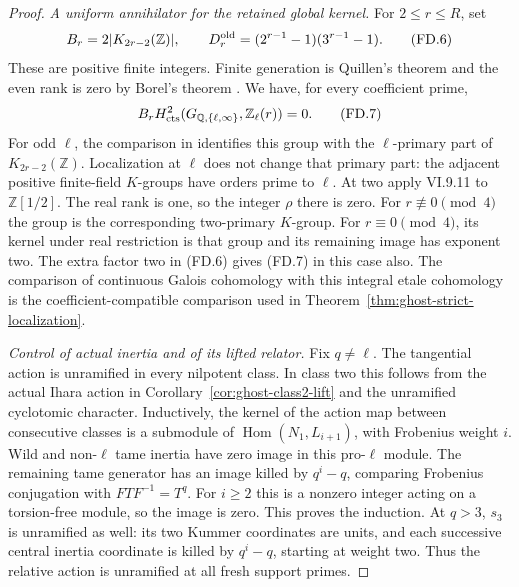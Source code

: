 \begin{proof}
\emph{A uniform annihilator for the retained global kernel.}
For \(2\le r\le R\), set
\[
 B_r=2\lvert K_{2r-2}(\mathbb Z)\rvert,
 \qquad D_r^{\rm old}=(2^{r-1}-1)(3^{r-1}-1).
 \tag{FD.6}
\]
These are positive finite integers. Finite
generation is Quillen's theorem and the even
rank is zero by Borel's theorem
\cite[IV.6.9, IV.1.18]{GhostWeibelKbook}.
We have, for every coefficient prime,
\[
 B_rH^2_{\rm cts}
 (G_{\mathbb Q,\{\ell,\infty\}},\mathbb Z_\ell(r))=0.
 \tag{FD.7}
\]
For odd \(\ell\), the comparison in
\cite[VI.8.2]{GhostWeibelKbook} identifies this
group with the \(\ell\)-primary part of
\(K_{2r-2}(\mathbb Z)\). Localization at \(\ell\)
does not change that primary part: the adjacent
positive finite-field \(K\)-groups have orders
prime to \(\ell\). At two apply VI.9.11 to
\(\mathbb Z[1/2]\). The real rank is one, so
the integer \(\rho\) there is zero. For
\(r\not\equiv0\pmod4\) the group is the
corresponding two-primary \(K\)-group. For
\(r\equiv0\pmod4\), its kernel under real
restriction is that group and its remaining
image has exponent two. The extra factor two
in (FD.6) gives (FD.7) in this case also.
The comparison of continuous Galois cohomology
with this integral etale cohomology is the
coefficient-compatible comparison used in
Theorem~\ref{thm:ghost-strict-localization}.

\emph{Control of actual inertia and of its lifted relator.}
Fix \(q\ne\ell\). The tangential action is
unramified in every nilpotent class. In class
two this follows from the actual Ihara action
in Corollary~\ref{cor:ghost-class2-lift} and
the unramified cyclotomic character. Inductively,
the kernel of the action map between consecutive
classes is a submodule of
\(\operatorname{Hom}(N_1,L_{i+1})\), with
Frobenius weight \(i\). Wild and non-\(\ell\)
tame inertia have zero image in this pro-\(\ell\)
module. The remaining tame generator has an
image killed by \(q^i-q\), comparing Frobenius
conjugation with \(FTF^{-1}=T^q\). For
\(i\ge2\) this is a nonzero integer acting on
a torsion-free module, so the image is zero.
This proves the induction. At \(q>3\),
\(s_3\) is unramified as well: its two Kummer
coordinates are units, and each successive
central inertia coordinate is killed by
\(q^i-q\), starting at weight two. Thus the
relative action is unramified at all fresh
support primes.


\end{proof}
